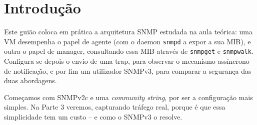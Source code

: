 \documentclass[11pt,a4paper]{article}
\begin{document}
\section{Introdução}
Este guião coloca em prática a arquitetura SNMP estudada na aula teórica: uma VM desempenha o papel de agente (com o daemon \texttt{snmpd} a expor a sua MIB), e outra o papel de manager, consultando essa MIB através de \texttt{snmpget} e \texttt{snmpwalk}. Configura-se depois o envio de uma trap, para observar o mecanismo assíncrono de notificação, e por fim um utilizador SNMPv3, para comparar a segurança das duas abordagens.

Começamos com SNMPv2c e uma \textit{community string}, por ser a configuração mais simples. Na Parte 3 veremos, capturando tráfego real, porque é que essa simplicidade tem um custo -- e como o SNMPv3 o resolve.
\end{document}
